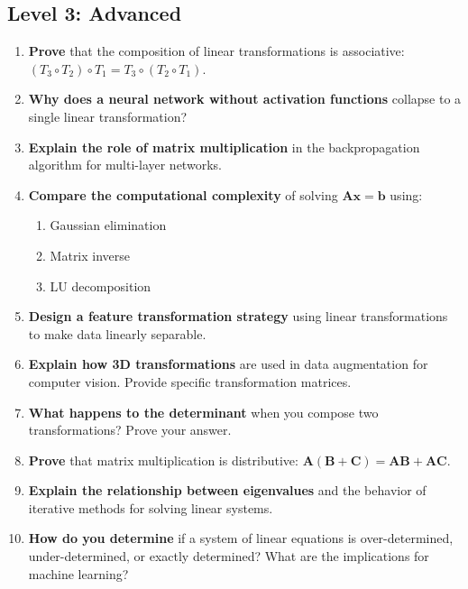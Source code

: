 \documentclass[12pt,a4paper]{article}
\theoremstyle{definition}
\begin{document}
\subsection{Level 3: Advanced}

\begin{enumerate}[resume]
\item \textbf{Prove} that the composition of linear transformations is associative: $(T_3 \circ T_2) \circ T_1 = T_3 \circ (T_2 \circ T_1)$.

\item \textbf{Why does a neural network without activation functions} collapse to a single linear transformation?

\item \textbf{Explain the role of matrix multiplication} in the backpropagation algorithm for multi-layer networks.

\item \textbf{Compare the computational complexity} of solving $\mathbf{Ax} = \mathbf{b}$ using:
\begin{enumerate}[label=(\alph*)]
\item Gaussian elimination
\item Matrix inverse
\item LU decomposition
\end{enumerate}

\item \textbf{Design a feature transformation strategy} using linear transformations to make data linearly separable.

\item \textbf{Explain how 3D transformations} are used in data augmentation for computer vision. Provide specific transformation matrices.

\item \textbf{What happens to the determinant} when you compose two transformations? Prove your answer.

\item \textbf{Prove} that matrix multiplication is distributive: $\mathbf{A}(\mathbf{B} + \mathbf{C}) = \mathbf{AB} + \mathbf{AC}$.

\item \textbf{Explain the relationship between eigenvalues} and the behavior of iterative methods for solving linear systems.

\item \textbf{How do you determine} if a system of linear equations is over-determined, under-determined, or exactly determined? What are the implications for machine learning?
\end{enumerate}
\end{document}
